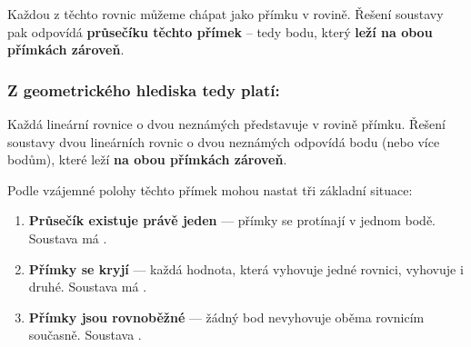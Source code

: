 \documentclass[12pt,a4paper]{article}
\begin{document}
Každou z těchto rovnic můžeme chápat jako přímku v rovině.  
Řešení soustavy pak odpovídá \textbf{průsečíku těchto přímek} – tedy bodu, který \textbf{leží na obou přímkách zároveň}.

\subsubsection*{Z geometrického hlediska tedy platí:}

\begin{notebox}
Každá lineární rovnice o dvou neznámých představuje v rovině přímku.  
Řešení soustavy dvou lineárních rovnic o dvou neznámých odpovídá bodu (nebo více bodům), které leží \textbf{na obou přímkách zároveň}.
\end{notebox}

\begin{center}
\end{center}


Podle vzájemné polohy těchto přímek mohou nastat tři základní situace:

\begin{enumerate}[label=\arabic*.]
  \item \textbf{Průsečík existuje právě jeden} — přímky se protínají v jednom bodě.  
  Soustava má .

  \item \textbf{Přímky se kryjí} — každá hodnota, která vyhovuje jedné rovnici, vyhovuje i druhé.  
  Soustava má .

  \item \textbf{Přímky jsou rovnoběžné} — žádný bod nevyhovuje oběma rovnicím současně.  
  Soustava .
\end{enumerate}
\end{document}
